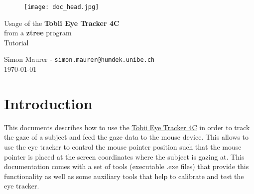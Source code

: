 \documentclass[a4paper,oneside]{book}
\begin{document}
\begin{figure}[h]
  \texttt{[image: doc\_head.jpg]}
\end{figure}

\parindent=0pt
\parskip=0.25cm

\begin{center}
\fontsize{20}{21}\selectfont

Usage of the \textbf{Tobii Eye Tracker 4C}\\
from a \textbf{ztree} program\\
\vskip 6mm
Tutorial
\vskip 6mm

\fontsize{13}{14}\selectfont
Simon Maurer - \texttt{simon.maurer@humdek.unibe.ch}\\
\today
\end{center}

\tableofcontents

\chapter{Introduction}\label{sec.intro}
This documents describes how to use the \href{https://tobiigaming.com/eye-tracker-4c/}{Tobii Eye Tracker 4C} in order to track the gaze of a subject and feed the gaze data to the mouse device.
This allows to use the eye tracker to control the mouse pointer position such that the mouse pointer is placed at the screen coordinates where the subject is gazing at.
This documentation comes with a set of tools (executable .exe files) that provide this functionality as well as some auxiliary tools that help to calibrate and test the eye tracker.
\end{document}
